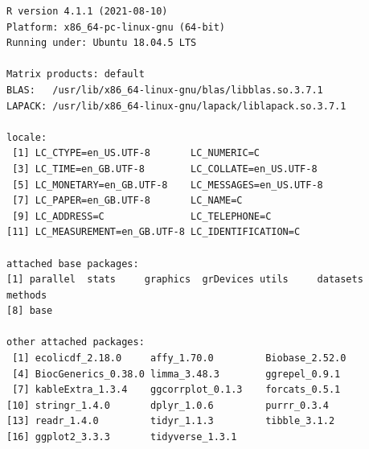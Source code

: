 \documentclass[
]{article}
\begin{document}
\begin{verbatim}
R version 4.1.1 (2021-08-10)
Platform: x86_64-pc-linux-gnu (64-bit)
Running under: Ubuntu 18.04.5 LTS

Matrix products: default
BLAS:   /usr/lib/x86_64-linux-gnu/blas/libblas.so.3.7.1
LAPACK: /usr/lib/x86_64-linux-gnu/lapack/liblapack.so.3.7.1

locale:
 [1] LC_CTYPE=en_US.UTF-8       LC_NUMERIC=C              
 [3] LC_TIME=en_GB.UTF-8        LC_COLLATE=en_US.UTF-8    
 [5] LC_MONETARY=en_GB.UTF-8    LC_MESSAGES=en_US.UTF-8   
 [7] LC_PAPER=en_GB.UTF-8       LC_NAME=C                 
 [9] LC_ADDRESS=C               LC_TELEPHONE=C            
[11] LC_MEASUREMENT=en_GB.UTF-8 LC_IDENTIFICATION=C       

attached base packages:
[1] parallel  stats     graphics  grDevices utils     datasets  methods  
[8] base     

other attached packages:
 [1] ecolicdf_2.18.0     affy_1.70.0         Biobase_2.52.0     
 [4] BiocGenerics_0.38.0 limma_3.48.3        ggrepel_0.9.1      
 [7] kableExtra_1.3.4    ggcorrplot_0.1.3    forcats_0.5.1      
[10] stringr_1.4.0       dplyr_1.0.6         purrr_0.3.4        
[13] readr_1.4.0         tidyr_1.1.3         tibble_3.1.2       
[16] ggplot2_3.3.3       tidyverse_1.3.1    


\end{verbatim}
\end{document}
